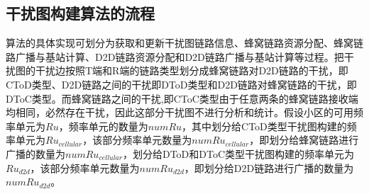 \documentclass[figurelist,tablelist,algorithmlist,nomlist,masters]{seuthesix}
\begin{document}
	\subsection{干扰图构建算法的流程}
	

	算法的具体实现可划分为获取和更新干扰图链路信息、蜂窝链路资源分配、蜂窝链路广播与基站计算、D2D链路资源分配和D2D链路广播与基站计算等过程。把干扰图的干扰边按照T端和R端的链路类型划分成蜂窝链路对D2D链路的干扰，即CToD类型、D2D链路之间的干扰即DToD类型和D2D链路对蜂窝链路的干扰，即DToC类型。而蜂窝链路之间的干扰,即CToC类型由于任意两条的蜂窝链路接收端均相同，必然存在干扰，因此这部分干扰图不进行分析和统计。假设小区的可用频率单元为$Ru$，频率单元的数量为$numRu$，其中划分给CToD类型干扰图构建的频率单元为$R{u_{cellular}}$，该部分频率单元数量为$numR{u_{cellular}}$，即划分给蜂窝链路进行广播的数量为$numR{u_{cellular}}$，划分给DToD和DToC类型干扰图构建的频率单元为$R{u_{d2d}}$，该部分频率单元数量为$numR{u_{d2d}}$，即划分给D2D链路进行广播的数量为$numR{u_{d2d}}$。
\end{document}
